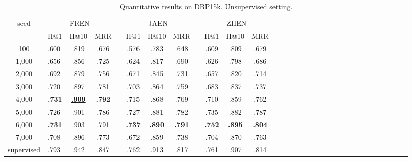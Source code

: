 \documentclass[letterpaper]{article} \usepackage{aaai21}  \usepackage{times}  \usepackage{helvet} \usepackage{courier}  \usepackage[hyphens]{url}  \usepackage{graphicx} \urlstyle{rm} \def\UrlFont{\rm}  \usepackage{natbib}  \usepackage{caption} \frenchspacing  \setlength{\pdfpagewidth}{8.5in}  \setlength{\pdfpageheight}{11in}
\begin{document}
\begin{table*}[h!] \small
\setlength{\tabcolsep}{3.2pt}
\caption{Quantitative results on DBP15k. Unsupervised setting.}
\label{Table:unsupervised_dbp15k_full}
\centering
\begin{tabular}{clccccccccccccccccccccccccccccc}
\toprule
 \multirow{2}{*}{seed}  &  \multicolumn{3}{c}{FREN} &  & \multicolumn{3}{c}{JAEN} &  &  \multicolumn{3}{c}{ZHEN} \\
 \cmidrule{2-4}\cmidrule{6-8} \cmidrule{10-12}
   &  {\scriptsize H@1} &\scriptsize H@10 &\scriptsize MRR & &\scriptsize H@1 &\scriptsize H@10 &\scriptsize MRR & &\scriptsize H@1 &\scriptsize H@10 &\scriptsize MRR \\
  \midrule
100    & .600 \scriptsize  & .819 \scriptsize  & .676 \scriptsize  & & .576 \scriptsize  & .783 \scriptsize  & .648 \scriptsize  & & .609 \scriptsize  & .809 \scriptsize  & .679 \scriptsize  \\
 1,000  & .656 \scriptsize  & .856 \scriptsize  & .725  \scriptsize  & & .624 \scriptsize  & .817 \scriptsize  & .690 \scriptsize  & & .626 \scriptsize  & .798 \scriptsize  & .686 \scriptsize \\ 
 2,000  & .692 \scriptsize  & .879 \scriptsize  & .756  \scriptsize  & & .671 \scriptsize  & .845 \scriptsize  & .731 \scriptsize  & & .657 \scriptsize  & .820 \scriptsize  & .714 \scriptsize \\ 
 3,000  & .720 \scriptsize  & .897 \scriptsize  & .781  \scriptsize  & & .703 \scriptsize  & .864 \scriptsize  & .759 \scriptsize  & & .683 \scriptsize  & .837 \scriptsize  & .737 \scriptsize \\
 4,000  & \textbf{.731} \scriptsize  & \underline{\textbf{.909}} \scriptsize  & \textbf{.792}  \scriptsize  & & .715 \scriptsize  & .868 \scriptsize  & .769 \scriptsize  & & .710 \scriptsize  & .859 \scriptsize  & .762 \scriptsize \\ 
 5,000  & .726 \scriptsize  & .901 \scriptsize  & .786  \scriptsize  & & .727 \scriptsize  & .881 \scriptsize  & .782 \scriptsize  & & .735 \scriptsize  & .882 \scriptsize  & .787 \scriptsize  \\  
 6,000  & \textbf{.731} \scriptsize  & .903 \scriptsize  & .791  \scriptsize  & & \underline{\textbf{.737}} \scriptsize  & \underline{\textbf{.890}} \scriptsize  & \underline{\textbf{.791}} \scriptsize  & & \underline{\textbf{.752}} \scriptsize  & \underline{\textbf{.895}} \scriptsize  & \underline{\textbf{.804}} \scriptsize  \\
 7,000  & .708 \scriptsize  & .896 \scriptsize  & .773  \scriptsize  & & .672 \scriptsize  & .859 \scriptsize  & .738 \scriptsize  & & .704 \scriptsize  & .870 \scriptsize  & .763 \scriptsize \\
\midrule
 \scriptsize supervised & .793 \scriptsize  & .942 \scriptsize  & .847 \scriptsize  & & .762 \scriptsize  & .913 \scriptsize  & .817 \scriptsize  & & .761 \scriptsize  & .907 \scriptsize  & .814 \scriptsize  \\
\bottomrule
\end{tabular}
\end{table*}
\end{document}
